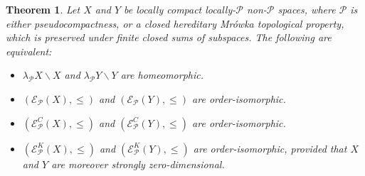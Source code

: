 \documentclass{amsart}
\newtheorem{theorem}{Theorem}[section]
\theoremstyle{definition}
\theoremstyle{remark}
\theoremstyle{notation}
\numberwithin{equation}{section}
\begin{document}
\begin{theorem}\label{FHFH}
Let $X$ and $Y$ be locally compact locally-${\mathcal P}$ non-${\mathcal P}$  spaces,  where  ${\mathcal P}$ is either pseudocompactness, or a
closed hereditary Mr\'{o}wka topological property, which is preserved under  finite closed sums of subspaces.
The following are equivalent:
\begin{itemize}
\item[\rm(1)] $\lambda_{{\mathcal P}} X\backslash X$ and $\lambda_{{\mathcal P}} Y\backslash Y$ are homeomorphic.
\item[\rm(2)] $({\mathscr E}_{{\mathcal P}}(X),\leq)$ and $({\mathscr E}_{{\mathcal P}}(Y),\leq)$ are order-isomorphic.
\item[\rm(3)] $({\mathscr E}^C_{{\mathcal P}}(X),\leq)$ and $({\mathscr E}^C_{{\mathcal P}}(Y),\leq)$ are order-isomorphic.
\item[\rm(4)] $({\mathscr E}^K_{{\mathcal P}}(X),\leq)$ and $({\mathscr E}^K_{{\mathcal P}}(Y),\leq)$ are order-isomorphic, provided that $X$ and $Y$ are moreover strongly zero-dimensional.
\end{itemize}
\end{theorem}
\end{document}
